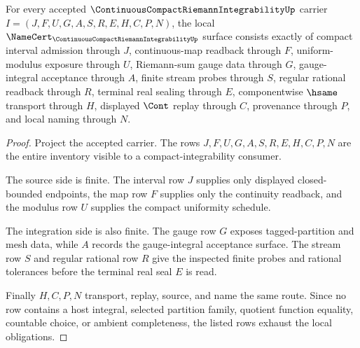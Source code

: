 \begin{theorem}
\label{thm:continuous-compact-riemann-integrability-obligations}
For every accepted $\ContinuousCompactRiemannIntegrabilityUp$ carrier $I=(J,F,U,G,A,S,R,E,H,C,P,N)$, the local $\NameCert_{\ContinuousCompactRiemannIntegrabilityUp}$ surface consists exactly of compact interval admission through $J$, continuous-map readback through $F$, uniform-modulus exposure through $U$, Riemann-sum gauge data through $G$, gauge-integral acceptance through $A$, finite stream probes through $S$, regular rational readback through $R$, terminal real sealing through $E$, componentwise $\hsame$ transport through $H$, displayed $\Cont$ replay through $C$, provenance through $P$, and local naming through $N$.
\end{theorem}
\begin{proof}
Project the accepted carrier. The rows $J,F,U,G,A,S,R,E,H,C,P,N$ are the entire inventory visible to a compact-integrability consumer.

The source side is finite. The interval row $J$ supplies only displayed closed-bounded endpoints, the map row $F$ supplies only the continuity readback, and the modulus row $U$ supplies the compact uniformity schedule.

The integration side is also finite. The gauge row $G$ exposes tagged-partition and mesh data, while $A$ records the gauge-integral acceptance surface. The stream row $S$ and regular rational row $R$ give the inspected finite probes and rational tolerances before the terminal real seal $E$ is read.

Finally $H,C,P,N$ transport, replay, source, and name the same route. Since no row contains a host integral, selected partition family, quotient function equality, countable choice, or ambient completeness, the listed rows exhaust the local obligations.
\end{proof}

